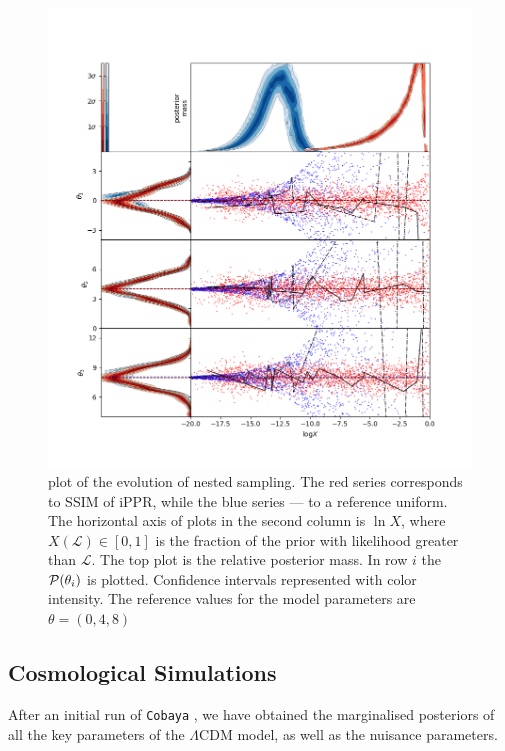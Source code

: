 \documentclass[draft,usenatbib]{mnras}
\begin{document}
\begin{figure}
\includegraphics[width=.99\textwidth]{./illustrations/higson.png}
\caption{plot of the evolution of nested sampling. The \color{red} red
\color{black} series corresponds to SSIM of iPPR, while the
\color{blue} blue \color{black} series --- to a reference
uniform. The horizontal axis of plots in the second column is
\(\ln X\), where \(X(\mathcal{L}) \in [0,1]\) is the fraction of the
prior with likelihood greater than \(\mathcal{L}\). The top plot is
the relative posterior mass. In row $i$ the ${\cal P}(\theta_{i})$
is plotted. Confidence intervals represented with color
intensity. The reference values for the model parameters are
\(\theta = (0, 4, 8)\) \label{fig:higson}}
\end{figure}

\subsection{Cosmological Simulations}
\label{sec:orgb6806f9}

After an initial run of \texttt{Cobaya} \citep{cobaya}, we have obtained the marginalised
posteriors of all the key parameters of the \(\Lambda\)CDM model,
as well as the nuisance parameters.
\end{document}
